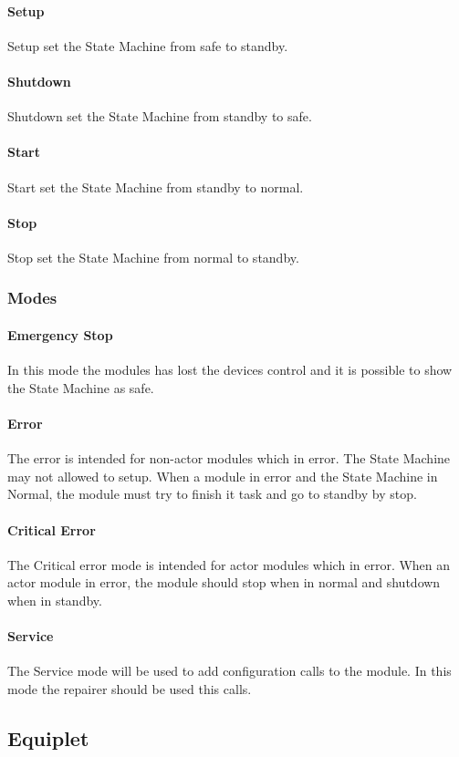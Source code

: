 \paragraph{Setup}Setup set the State Machine from safe to standby.
\paragraph{Shutdown}Shutdown set the State Machine from standby to safe.
\paragraph{Start}Start set the State Machine from standby to normal.
\paragraph{Stop}Stop set the State Machine from normal to standby.

\subsubsection{Modes}
\paragraph{Emergency Stop}In this mode the modules has lost the devices control and it is possible to show the State Machine as safe.
\paragraph{Error}The error is intended for non-actor modules which in error. The State Machine may not allowed to setup. When a module in error and the State Machine in Normal, the module must try to finish it task and go to standby by stop.
\paragraph{Critical Error}The Critical error mode is intended for actor modules which in error. When an actor module in error, the module should stop when in normal and shutdown when in standby.
\paragraph{Service}The Service mode will be used to add configuration calls to the module. In this mode the repairer should be used this calls.

\subsection{Equiplet}
